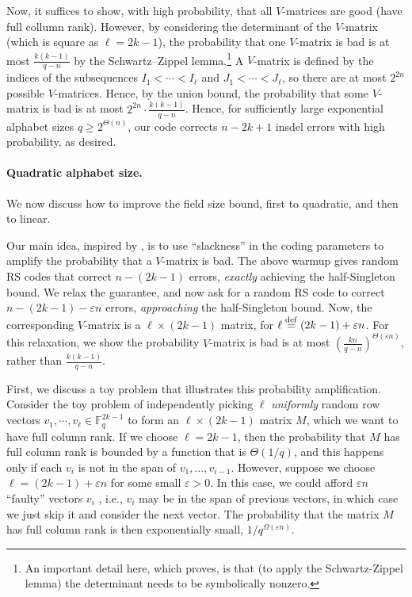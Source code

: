 \documentclass[11pt]{article}
\newcommand\defeq{\ensuremath{\stackrel{\rm def}{=}}}
\theoremstyle{plain}
\theoremstyle{definition}
\theoremstyle{remark}
\begin{document}
Now, it suffices to show, with high probability, that all $V$-matrices are good (have full collumn rank).
However, by considering the determinant of the $V$-matrix (which is square as $\ell=2k-1$), the probability that one $V$-matrix is bad is at most $\frac{k(k-1)}{q-n}$ by the Schwartz--Zippel lemma.\footnote{An important detail here, which \cite{con2023reed} proves, is that (to apply the Schwartz-Zippel lemma) the determinant needs to be symbolically nonzero.} 
A $V$-matrix is defined by the indices of the subsequences $I_1<\cdots<I_\ell$ and $J_1<\cdots<J_\ell$, so there are at most $2^{2n}$ possible $V$-matrices.
Hence, by the union bound, the probability that some $V$-matrix is bad is at most $2^{2n}\cdot \frac{k(k-1)}{q-n}$.
Hence, for sufficiently large exponential alphabet sizes $q\ge 2^{\Theta(n)}$, our code corrects $n-2k+1$ insdel errors with high probability, as desired.




\paragraph{Quadratic alphabet  size.} 
We now discuss how to improve the field size bound, first to quadratic, and then to linear.

Our main idea, inspired by \cite{GZ23,alrabiah2023randomly}, is to use ``slackness'' in the coding parameters to amplify the probability that a $V$-matrix is bad.
The above warmup gives random RS codes that correct $n-(2k-1)$ errors, \emph{exactly} achieving the half-Singleton bound.
We relax the guarantee, and now ask for a random RS code to correct $n-(2k-1)-\varepsilon n$ errors, \emph{approaching} the half-Singleton bound.
Now, the corresponding $V$-matrix is a $\ell\times (2k-1)$ matrix, for $\ell\defeq (2k-1)+\varepsilon n$.
For this relaxation, we show the probability $V$-matrix is bad is at most $\left(\frac{kn}{q-n}\right)^{\Theta(\varepsilon n)}$, rather than $\frac{k(k-1)}{q-n}$. 

First, we discuss a toy problem that illustrates this probability amplification.
Consider the toy problem of independently picking $\ell$ \emph{uniformly} random row vectors $v_1,\cdots,v_\ell\in\mathbb{F}_q^{2k-1}$ to form an $\ell\times (2k-1)$ matrix $M$, which we want to have full column rank. If we choose $\ell=2k-1$, then the probability that $M$ has full column rank is bounded by a function that is $\Theta(1/q)$, and this happens only if each $v_i$ is not in the span of $v_1,\dots, v_{i-1}$. However, suppose we choose $\ell = (2k-1)+\varepsilon n$ for some small $\varepsilon > 0$. In this case, we could afford $\varepsilon n$ ``faulty'' vectors $v_i$ , i.e., $v_i$ may be in the span of previous vectors, in which case we just skip it and consider the next vector. The probability that the matrix $M$ has full column rank is then exponentially small, $1/q^{\Omega(\varepsilon n)}$.
\end{document}

